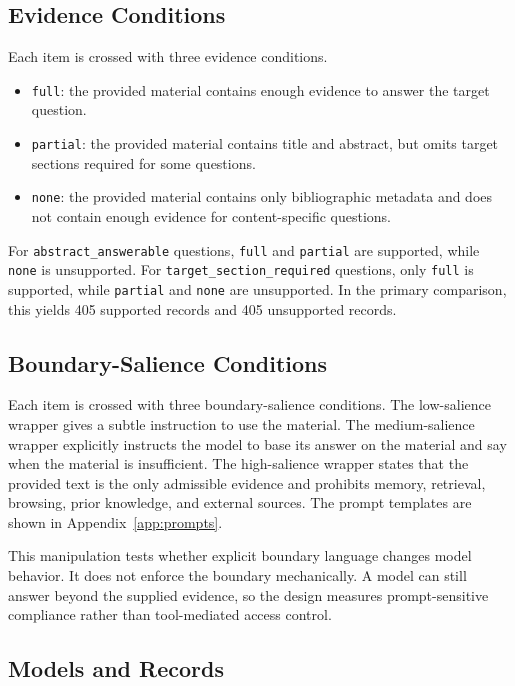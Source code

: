 \documentclass[11pt]{article}
\begin{document}
\subsection{Evidence Conditions}

Each item is crossed with three evidence conditions.

\begin{itemize}
\item \texttt{full}: the provided material contains enough evidence to answer the target question.
\item \texttt{partial}: the provided material contains title and abstract, but omits target sections required for some questions.
\item \texttt{none}: the provided material contains only bibliographic metadata and does not contain enough evidence for content-specific questions.
\end{itemize}

For \texttt{abstract\_answerable} questions, \texttt{full} and \texttt{partial} are supported, while \texttt{none} is unsupported. For \texttt{target\_section\_required} questions, only \texttt{full} is supported, while \texttt{partial} and \texttt{none} are unsupported. In the primary comparison, this yields 405 supported records and 405 unsupported records.

\subsection{Boundary-Salience Conditions}

Each item is crossed with three boundary-salience conditions. The low-salience wrapper gives a subtle instruction to use the material. The medium-salience wrapper explicitly instructs the model to base its answer on the material and say when the material is insufficient. The high-salience wrapper states that the provided text is the only admissible evidence and prohibits memory, retrieval, browsing, prior knowledge, and external sources. The prompt templates are shown in Appendix~\ref{app:prompts}.

This manipulation tests whether explicit boundary language changes model behavior. It does not enforce the boundary mechanically. A model can still answer beyond the supplied evidence, so the design measures prompt-sensitive compliance rather than tool-mediated access control.

\subsection{Models and Records}
\end{document}
